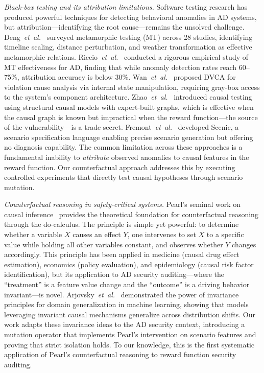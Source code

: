\documentclass[journal]{IEEEtran}
\theoremstyle{plain}
\begin{document}
\emph{Black-box testing and its attribution limitations.} Software testing research has produced powerful techniques for detecting behavioral anomalies in AD systems, but attribution---identifying the root cause---remains the unsolved challenge. Deng~\emph{et~al.}~\cite{deng2023rmt} surveyed metamorphic testing (MT) across 28 studies, identifying timeline scaling, distance perturbation, and weather transformation as effective metamorphic relations. Riccio~\emph{et~al.}~\cite{riccio2023effectiveness} conducted a rigorous empirical study of MT effectiveness for AD, finding that while anomaly detection rates reach 60--75\%, attribution accuracy is below 30\%. Wan~\emph{et~al.}~\cite{wan2024dvca} proposed DVCA for violation cause analysis via internal state manipulation, requiring gray-box access to the system's component architecture. Zhao~\emph{et~al.}~\cite{zhao2023causal} introduced causal testing using structural causal models with expert-built graphs, which is effective when the causal graph is known but impractical when the reward function---the source of the vulnerability---is a trade secret. Fremont~\emph{et~al.}~\cite{fremont2022scenic} developed Scenic, a scenario specification language enabling precise scenario generation but offering no diagnosis capability. The common limitation across these approaches is a fundamental inability to \emph{attribute} observed anomalies to causal features in the reward function. Our counterfactual approach addresses this by executing controlled experiments that directly test causal hypotheses through scenario mutation.

\emph{Counterfactual reasoning in safety-critical systems.} Pearl's seminal work on causal inference~\cite{pearl2019probabilistic} provides the theoretical foundation for counterfactual reasoning through the do-calculus. The principle is simple yet powerful: to determine whether a variable $X$ causes an effect $Y$, one intervenes to set $X$ to a specific value while holding all other variables constant, and observes whether $Y$ changes accordingly. This principle has been applied in medicine (causal drug effect estimation), economics (policy evaluation), and epidemiology (causal risk factor identification), but its application to AD security auditing---where the ``treatment'' is a feature value change and the ``outcome'' is a driving behavior invariant---is novel. Arjovsky~\emph{et~al.}~\cite{arjovsky2019invariant} demonstrated the power of invariance principles for domain generalization in machine learning, showing that models leveraging invariant causal mechanisms generalize across distribution shifts. Our work adapts these invariance ideas to the AD security context, introducing a mutation operator that implements Pearl's intervention on scenario features and proving that strict isolation holds. To our knowledge, this is the first systematic application of Pearl's counterfactual reasoning to reward function security auditing.
\end{document}
